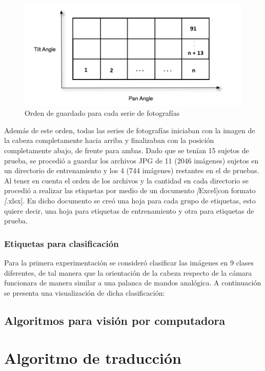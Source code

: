 \begin{figure}[H]
	\centering
	\includegraphics[scale=1]{figures/faceorder.png}
	\caption{Orden de guardado para cada serie de fotografías}
	\label{fig:img1}
\end{figure}

Además de este orden, todas las series de fotografías iniciaban con la imagen de la cabeza completamente hacia arriba y finalizaban con la posición completamente abajo, de frente para ambas. Dado que se tenían 15 sujetos de prueba, se procedió a guardar los archivos JPG de 11 (2046 imágenes) sujetos en un directorio de entrenamiento y los 4 (744 imágenes) restantes en el de pruebas. Al tener en cuenta el orden de los archivos y la cantidad en cada directorio se procedió a realizar las etiquetas por medio de un documento \textit[Excel]con formato \textit[.xlsx]. En dicho documento se creó una hoja para cada grupo de etiquetas, esto quiere decir, una hoja para etiquetas de entrenamiento y otra para etiquetas de prueba.

\subsection{Etiquetas para clasificación}

Para la primera experimentación se consideró clasificar las imágenes en 9 clases diferentes, de tal manera que la orientación de la cabeza respecto de la cámara funcionara de manera similar a una palanca de mandos analógica. A continuación se presenta una visualización de dicha clasificación:

\section{Algoritmos para visión por computadora}


\chapter{Algoritmo de traducción}

